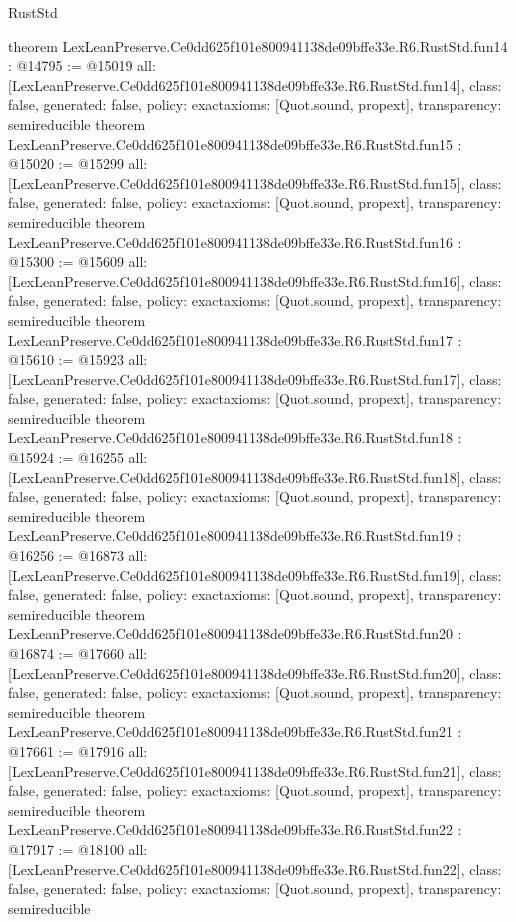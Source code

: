 \begin{lexlean}{RustStd}
\begin{coremodule}
{}
theorem LexLeanPreserve.Ce0dd625f101e800941138de09bffe33e.R6.RustStd.fun14 : @14795 := @15019 {
  all: [LexLeanPreserve.Ce0dd625f101e800941138de09bffe33e.R6.RustStd.fun14],
  class: false,
  generated: false,
  policy: exact{axioms: [Quot.sound, propext]},
  transparency: semireducible
}
theorem LexLeanPreserve.Ce0dd625f101e800941138de09bffe33e.R6.RustStd.fun15 : @15020 := @15299 {
  all: [LexLeanPreserve.Ce0dd625f101e800941138de09bffe33e.R6.RustStd.fun15],
  class: false,
  generated: false,
  policy: exact{axioms: [Quot.sound, propext]},
  transparency: semireducible
}
theorem LexLeanPreserve.Ce0dd625f101e800941138de09bffe33e.R6.RustStd.fun16 : @15300 := @15609 {
  all: [LexLeanPreserve.Ce0dd625f101e800941138de09bffe33e.R6.RustStd.fun16],
  class: false,
  generated: false,
  policy: exact{axioms: [Quot.sound, propext]},
  transparency: semireducible
}
theorem LexLeanPreserve.Ce0dd625f101e800941138de09bffe33e.R6.RustStd.fun17 : @15610 := @15923 {
  all: [LexLeanPreserve.Ce0dd625f101e800941138de09bffe33e.R6.RustStd.fun17],
  class: false,
  generated: false,
  policy: exact{axioms: [Quot.sound, propext]},
  transparency: semireducible
}
theorem LexLeanPreserve.Ce0dd625f101e800941138de09bffe33e.R6.RustStd.fun18 : @15924 := @16255 {
  all: [LexLeanPreserve.Ce0dd625f101e800941138de09bffe33e.R6.RustStd.fun18],
  class: false,
  generated: false,
  policy: exact{axioms: [Quot.sound, propext]},
  transparency: semireducible
}
theorem LexLeanPreserve.Ce0dd625f101e800941138de09bffe33e.R6.RustStd.fun19 : @16256 := @16873 {
  all: [LexLeanPreserve.Ce0dd625f101e800941138de09bffe33e.R6.RustStd.fun19],
  class: false,
  generated: false,
  policy: exact{axioms: [Quot.sound, propext]},
  transparency: semireducible
}
theorem LexLeanPreserve.Ce0dd625f101e800941138de09bffe33e.R6.RustStd.fun20 : @16874 := @17660 {
  all: [LexLeanPreserve.Ce0dd625f101e800941138de09bffe33e.R6.RustStd.fun20],
  class: false,
  generated: false,
  policy: exact{axioms: [Quot.sound, propext]},
  transparency: semireducible
}
theorem LexLeanPreserve.Ce0dd625f101e800941138de09bffe33e.R6.RustStd.fun21 : @17661 := @17916 {
  all: [LexLeanPreserve.Ce0dd625f101e800941138de09bffe33e.R6.RustStd.fun21],
  class: false,
  generated: false,
  policy: exact{axioms: [Quot.sound, propext]},
  transparency: semireducible
}
theorem LexLeanPreserve.Ce0dd625f101e800941138de09bffe33e.R6.RustStd.fun22 : @17917 := @18100 {
  all: [LexLeanPreserve.Ce0dd625f101e800941138de09bffe33e.R6.RustStd.fun22],
  class: false,
  generated: false,
  policy: exact{axioms: [Quot.sound, propext]},
  transparency: semireducible
}
\end{coremodule}
\end{lexlean}
